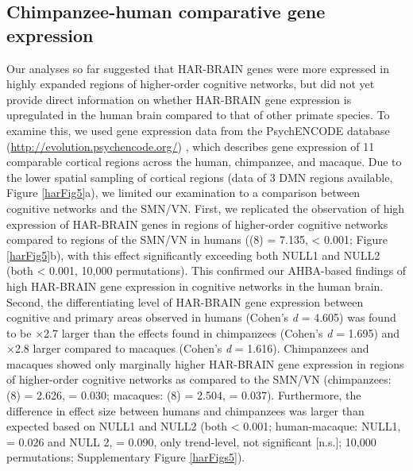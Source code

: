 \begin{refsection}
\subsection*{Chimpanzee-human comparative gene expression}
Our analyses so far suggested that HAR-BRAIN genes were more expressed in highly expanded regions of higher-order cognitive networks, but did not yet provide direct information on whether HAR-BRAIN gene expression is upregulated in the human brain compared to that of other primate species. To examine this, we used gene expression data from the PsychENCODE database (\url{http://evolution.psychencode.org/}) \citep{sousa2017molecular}, which describes gene expression of 11 comparable cortical regions across the human, chimpanzee, and macaque. Due to the lower spatial sampling of cortical regions (data of 3 DMN regions available, Figure \ref{harFig5}a), we limited our examination to a comparison between cognitive networks and the SMN/VN. First, we replicated the observation of high expression of HAR-BRAIN genes in regions of higher-order cognitive networks compared to regions of the SMN/VN in humans (\tvaldf(8) = 7.135, \pval < 0.001; Figure \ref{harFig5}b), with this effect significantly exceeding both NULL1 and NULL2 (both \pval < 0.001, 10,000 permutations). This confirmed our AHBA-based findings of high HAR-BRAIN gene expression in cognitive networks in the human brain. Second, the differentiating level of HAR-BRAIN gene expression between cognitive and primary areas observed in humans (Cohen's \textit{d} = 4.605) was found to be $\times$2.7 larger than the effects found in chimpanzees (Cohen's \textit{d} = 1.695) and $\times$2.8 larger compared to macaques (Cohen's \textit{d} = 1.616). Chimpanzees and macaques showed only marginally higher HAR-BRAIN gene expression in regions of higher-order cognitive networks as compared to the SMN/VN (chimpanzees: \tvaldf(8) = 2.626, \pval = 0.030; macaques: \tvaldf(8) = 2.504, \pval = 0.037). Furthermore, the difference in effect size between humans and chimpanzees was larger than expected based on NULL1 and NULL2 (both \pval < 0.001; human-macaque: NULL1, \pval = 0.026 and NULL 2, \pval = 0.090, only trend-level, not significant [n.s.]; 10,000 permutations; Supplementary Figure \ref{harFigs5}).


\end{refsection}
